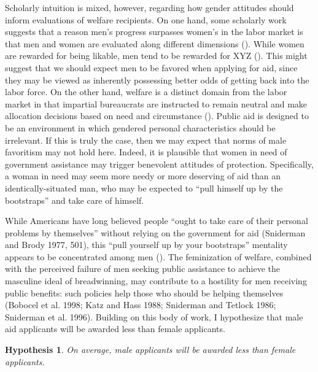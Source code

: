 \documentclass[12pt]{article}%
\newtheorem{hypothesis}{Hypothesis}
\begin{document}
\begin{doublespace}
Scholarly intuition is mixed, however, regarding how gender attitudes should inform evaluations of welfare recipients. On one hand, some scholarly work suggests that a reason men’s progress surpasses women’s in the labor market is that men and women are evaluated along different dimensions (). While women are rewarded for being likable, men tend to be rewarded for {XYZ} (). This might suggest that we should expect men to be favored when applying for aid, since they may be viewed as inherently possessing better odds of getting back into the labor force. On the other hand, welfare is a distinct domain from the labor market in that impartial bureaucrats are instructed to remain neutral  and make allocation decisions based on need and circumstance (). Public aid is designed to be an environment in which gendered personal characteristics should be irrelevant. If this is truly the case, then we may expect that norms of male favoritism may not hold here. Indeed, it is plausible that women in need of government assistance may trigger benevolent attitudes of protection. Specifically, a woman in need may seem more needy or more deserving of aid than an identically-situated man, who may be expected to “pull himself up by the bootstraps” and take care of himself. 


While Americans have long believed people “ought to take care of their personal problems by themselves” without relying on the government for aid (Sniderman and Brody 1977, 501), this “pull yourself up by your bootstraps” mentality appears to be concentrated among men (). The feminization of welfare, combined with the perceived failure of men seeking public assistance to achieve the masculine ideal of breadwinning, may contribute to a hostility for men receiving public benefits: such policies help those who should be helping themselves (Bobocel et al. 1998; Katz and Hass 1988; Sniderman and Tetlock 1986; Sniderman et al. 1996). Building on this body of work, I hypothesize that male aid applicants will be awarded less than female applicants.

\begin{hypothesis} \label{hyp:first}
	On average, male applicants will be awarded less than female applicants.
\end{hypothesis}


\end{doublespace}
\end{document}
